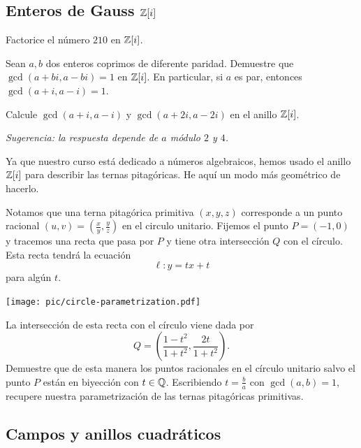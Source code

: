 \subsection*{Enteros de Gauss $\mathbb{Z} [i]$}

\begin{ejercicio}
  Factorice el número $210$ en $\mathbb{Z} [i]$.
\end{ejercicio}

\begin{ejercicio}
  Sean $a,b$ dos enteros coprimos de diferente paridad. Demuestre que
  $\gcd (a + bi, a - bi) = 1$ en $\mathbb{Z} [i]$. En particular, si $a$ es par,
  entonces $\gcd (a + i, a - i) = 1$.
\end{ejercicio}

\begin{ejercicio}
  Calcule $\gcd (a + i, a - i)$ y $\gcd (a + 2i, a - 2i)$ en el anillo
  $\mathbb{Z} [i]$.

  \emph{Sugerencia: la respuesta depende de $a$ módulo $2$ y $4$.}
\end{ejercicio}

\begin{ejercicio}
  Ya que nuestro curso está dedicado a números algebraicos, hemos usado el
  anillo $\mathbb{Z} [i]$ para describir las ternas pitagóricas. He aquí un modo más
  geométrico de hacerlo.

  Notamos que una terna pitagórica primitiva $(x,y,z)$ corresponde a un punto
  racional $(u,v) = \left(\frac{x}{y}, \frac{y}{z}\right)$ en el circulo
  unitario. Fijemos el punto $P = (-1,0)$ y tracemos una recta que pasa por $P$
  y tiene otra intersección $Q$ con el círculo. Esta recta tendrá la ecuación
  $$\ell\colon y = tx + t$$
  para algún $t$.

  \begin{center}
    \texttt{[image: pic/circle-parametrization.pdf]}
  \end{center}

  La intersección de esta recta con el círculo viene dada por
  $$Q = \left(\frac{1 - t^2}{1 + t^2}, \frac{2t}{1 + t^2}\right).$$ Demuestre
  que de esta manera los puntos racionales en el círculo unitario salvo el punto
  $P$ están en biyección con $t \in \mathbb{Q}$. Escribiendo $t = \frac{b}{a}$ con
  $\gcd (a,b) = 1$, recupere nuestra parametrización de las ternas pitagóricas
  primitivas.
\end{ejercicio}

\subsection*{Campos y anillos cuadráticos}

